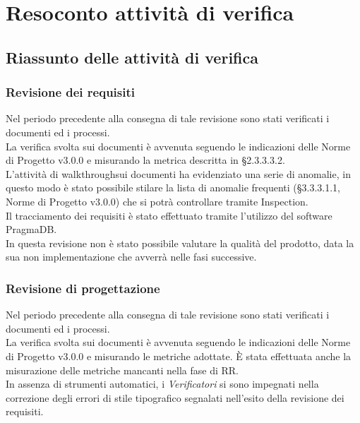 \section{Resoconto attività di verifica}

\subsection{Riassunto delle attività di verifica}

	\subsubsection{Revisione dei requisiti}
	
	Nel periodo precedente alla consegna di tale revisione sono stati verificati i documenti ed i processi. \\
	La verifica svolta sui documenti è avvenuta seguendo le indicazioni delle Norme di Progetto v3.0.0 e misurando la metrica descritta in §2.3.3.3.2. \\
	L'attività di walkthrough\glosp sui documenti ha evidenziato una serie di anomalie, in questo modo è stato possibile stilare la lista di anomalie frequenti (§3.3.3.1.1, Norme di Progetto v3.0.0) che si potrà controllare tramite Inspection\glosp. \\
	Il tracciamento dei requisiti è stato effettuato tramite l'utilizzo del software PragmaDB. \\
	In questa revisione non è stato possibile valutare la qualità del prodotto, data la sua non implementazione che avverrà nelle fasi successive.
	
	\subsubsection{Revisione di progettazione}
	
	Nel periodo precedente alla consegna di tale revisione sono stati verificati i documenti ed i processi. \\
	La verifica svolta sui documenti è avvenuta seguendo le indicazioni delle Norme di Progetto v3.0.0 e misurando le metriche adottate. È stata effettuata anche la misurazione delle metriche mancanti nella fase di RR. \\
	In assenza di strumenti automatici, i \textit{Verificatori} si sono impegnati nella correzione degli errori di stile tipografico segnalati nell'esito della revisione dei requisiti.
	
